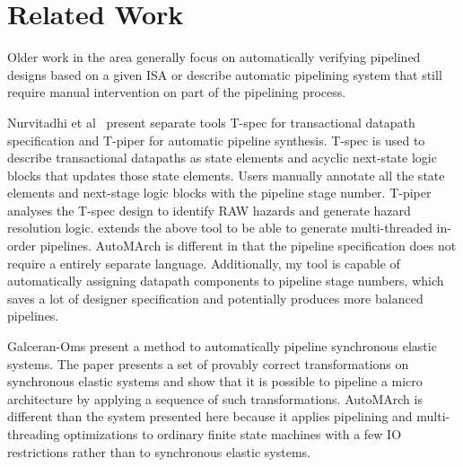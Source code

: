 \section{Related Work}
Older work in the area \cite{Kroening:2001-95}\cite{Matthews:1999-106}\cite{Marinescu:2001-105}\cite{Higgins:2005-76}\cite{Mishra:2004-111} generally focus on automatically verifying pipelined designs based on a given ISA or describe automatic pipelining system that still require manual intervention on part of the pipelining process.

Nurvitadhi et al~\cite{hoe:syn} present separate tools T-spec for transactional datapath specification and T-piper for automatic pipeline synthesis. T-spec is used to describe transactional datapaths as state elements and acyclic next-state logic blocks that updates those state elements. Users manually annotate all the state elements and next-stage logic blocks with the pipeline stage number. T-piper analyses the T-spec design to identify RAW hazards and generate hazard resolution logic. \cite{hoe:mult} extends the above tool to be able to generate multi-threaded in-order pipelines. AutoMArch is different in that the pipeline specification does not require a entirely separate language. Additionally, my tool is capable of automatically assigning datapath components to pipeline stage numbers, which saves a lot of designer specification and potentially produces more balanced pipelines.

Galceran-Oms \cite{AutoPipeElastic} present a method to automatically pipeline synchronous elastic systems. The paper presents a set of provably correct transformations on synchronous elastic systems and show that it is possible to pipeline a micro architecture by applying a sequence of such transformations. AutoMArch is different than the system presented here because it applies pipelining and multi-threading optimizations to ordinary finite state machines with a few IO restrictions rather than to synchronous elastic systems.
